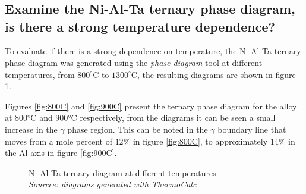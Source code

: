 \newpage
\section{}

\subsection{Examine the Ni-Al-Ta ternary phase diagram, is there a strong temperature dependence?}

To evaluate if there is a strong dependence on temperature, the Ni-Al-Ta ternary phase diagram was generated using the \textit{phase diagram} tool at different temperatures, from $800^{\circ}$C to $1300^{\circ}$C, the resulting diagrams are shown in figure \ref{fig:diagram02}.

Figures \ref{fig:800C} and \ref{fig:900C} present the ternary phase diagram for the alloy at $800$°C and $900$°C respectively, from the diagrams it can be seen a small increase in the $\gamma$ phase  region. This can be noted in the $\gamma$ boundary line that moves from a mole percent of $12\%$ in figure \ref{fig:800C}, to approximately $14\%$ in the Al axis in figure \ref{fig:900C}.

\begin{figure}[h]
  \centering
  \caption{\centering Ni-Al-Ta ternary diagram at different temperatures \\
  \textit{Sourcce: diagrams generated with ThermoCalc \citep{thermocalc}}}
  \label{fig:diagram02}
\end{figure}

